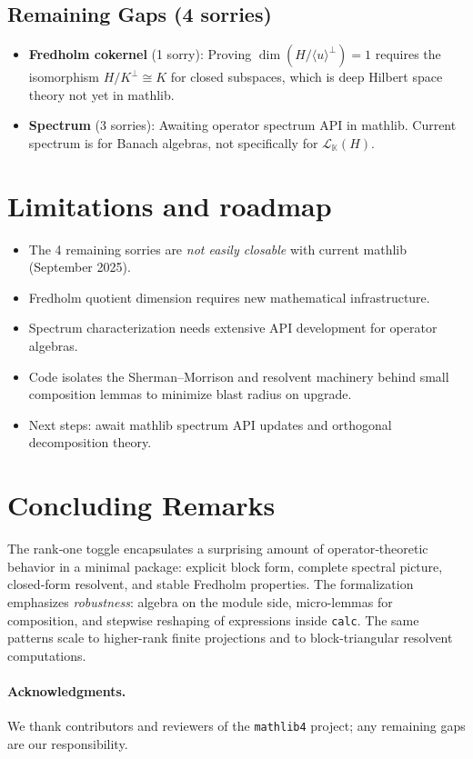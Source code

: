\documentclass[11pt]{article}
\theoremstyle{definition}
\begin{document}
\subsection{Remaining Gaps (4 sorries)}
\begin{itemize}
\item \textbf{Fredholm cokernel} (1 sorry): Proving $\dim(H/\langle u\rangle^\perp) = 1$ requires the isomorphism $H/K^\perp \cong K$ for closed subspaces, which is deep Hilbert space theory not yet in mathlib.
\item \textbf{Spectrum} (3 sorries): Awaiting operator spectrum API in mathlib. Current spectrum is for Banach algebras, not specifically for $\mathcal{L}_\mathbb{K}(H)$.
\end{itemize}

\section{Limitations and roadmap}
\begin{itemize}
\item The 4 remaining sorries are \emph{not easily closable} with current mathlib (September 2025).
\item Fredholm quotient dimension requires new mathematical infrastructure.
\item Spectrum characterization needs extensive API development for operator algebras.
\item Code isolates the Sherman--Morrison and resolvent machinery behind small composition lemmas to minimize blast radius on upgrade.
\item Next steps: await mathlib spectrum API updates and orthogonal decomposition theory.
\end{itemize}

\section{Concluding Remarks}

The rank‑one toggle encapsulates a surprising amount of operator‑theoretic behavior in a minimal package: explicit block form, complete spectral picture, closed‑form resolvent, and stable Fredholm properties. The formalization emphasizes \emph{robustness}: algebra on the module side, micro-lemmas for composition, and stepwise reshaping of expressions inside \texttt{calc}. The same patterns scale to higher-rank finite projections and to block-triangular resolvent computations.

\paragraph{Acknowledgments.}
We thank contributors and reviewers of the \texttt{mathlib4} project; any remaining gaps are our responsibility.
\end{document}
